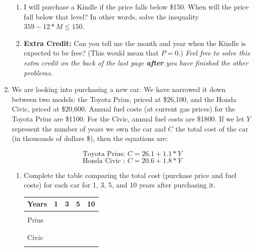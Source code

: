 \documentclass[12pt]{article}
\begin{document}
\begin{enumerate}
\begin{enumerate}

\item  I will purchase a Kindle if the price falls below \$150.  When will the price fall below that level?  In other words, solve the inequality $359-12* M \le 150$.
\vfill
\item \textbf{Extra Credit:} Can you tell me the month and year when the Kindle is expected to be free?  (This would mean that $P=0$.) \emph{Feel free to solve this extra credit on the back of the last page \textbf{after} you have finished the other problems.}
\end{enumerate}
\newpage
\item We are looking into purchasing a new car.  We have narrowed it down between two models: the Toyota Prius, priced at \$26,100, and the Honda Civic, priced at \$20,600.  Annual fuel costs (at current gas prices) for the Toyota Prius are \$1100.  For the Civic, annual fuel costs are \$1800.   If we let $Y$ represent the number of years we own the car and $C$ the total cost of the car (in thousands of dollars \$), then the equations are:

$$\text{Toyota Prius:  }C = 26.1 + 1.1*Y$$
$$\text{Honda Civic :  }C = 20.6 + 1.8*Y$$

\begin{enumerate}
\item Complete the table comparing the total cost (purchase price and fuel costs) for each car for 1, 3, 5, and 10 years after purchasing it.


\begin{center}
\begin{tabular} {|l |c |c |c |c |} \hline
Years &\hspace{.25in} 1\hspace{.25in} & \hspace{.25in}3\hspace{.25in} & \hspace{.25in}5\hspace{.25in} &\hspace{.25in}10\hspace{.25in} \\ \hline
&&&& \\ 
Prius &&&& \\ 
&&&& \\ \hline
&&&& \\ 
Civic &&&& \\  
&&&& \\ \hline
\end{tabular}
\end{center}




\end{enumerate}
\end{enumerate}
\end{document}
